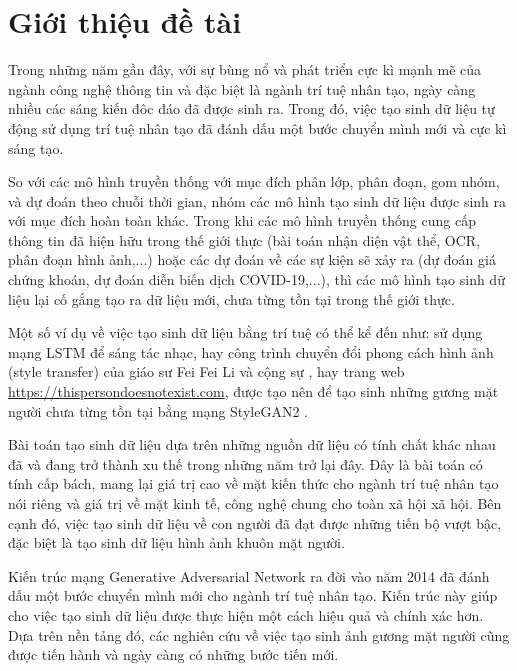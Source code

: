 \chapter{Giới thiệu đề tài}

Trong những năm gần đây, với sự bùng nổ và phát triển cực kì mạnh mẽ của ngành công nghệ thông tin và đặc biệt là ngành trí tuệ nhân tạo, ngày càng nhiều các sáng kiến đôc đáo đã được sinh ra. Trong đó, việc tạo sinh dữ liệu tự động sử dụng trí tuệ nhân tạo đã đánh dấu một bước chuyển mình mới và cực kì sáng tạo.

So với các mô hình truyền thống với mục đích phân lớp, phân đoạn, gom nhóm, và dự đoán theo chuỗi thời gian, nhóm các mô hình tạo sinh dữ liệu được sinh ra với mục đích hoàn toàn khác. Trong khi các mô hình truyền thống cung cấp thông tin đã hiện hữu trong thế giới thực (bài toán nhận diện vật thể, OCR, phân đoạn hình ảnh,...) hoặc các dự đoán về các sự kiện sẽ xảy ra (dự đoán giá chứng khoán, dự đoán diễn biến dịch COVID-19,...), thì các mô hình tạo sinh dữ liệu lại cố gắng tạo ra dữ liệu mới, chưa từng tồn tại trong thế giới thực.

Một số ví dụ về việc tạo sinh dữ liệu bằng trí tuệ có thể kể đến như: sử dụng mạng LSTM để sáng tác nhạc, hay công trình chuyển đổi phong cách hình ảnh (style transfer) của giáo sư Fei Fei Li và cộng sự \cite{Johnson2016Perceptual}, hay trang web \url{https://thispersondoesnotexist.com}, được tạo nên để tạo sinh những gương mặt người chưa từng tồn tại bằng mạng StyleGAN2 \cite{stylegans}.

Bài toán tạo sinh dữ liệu dựa trên những nguồn dữ liệu có tính chất khác nhau đã và đang trở thành xu thế trong những năm trở lại đây. Đây là bài toán có tính cấp bách, mang lại giá trị cao về mặt kiến thức cho ngành trí tuệ nhân tạo nói riêng và giá trị về mặt kinh tế, công nghệ chung cho toàn xã hội xã hội. Bên cạnh đó, việc tạo sinh dữ liệu về con người đã đạt được những tiến bộ vượt bậc, đặc biệt là tạo sinh dữ liệu hình ảnh khuôn mặt người.

Kiến trúc mạng Generative Adversarial Network \cite{gans_base} ra đời vào năm 2014 đã đánh dấu một bước chuyển mình mới cho ngành trí tuệ nhân tạo. Kiến trúc này giúp cho việc tạo sinh dữ liệu được thực hiện một cách hiệu quả và chính xác hơn. Dựa trên nền tảng đó, các nghiên cứu về việc tạo sinh ảnh gương mặt người cũng được tiến hành và ngày càng có những bước tiến mới.

